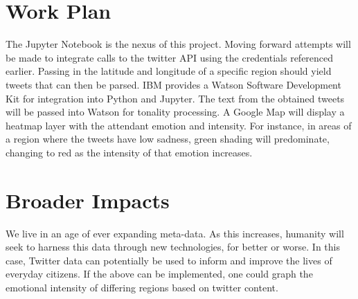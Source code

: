 \documentclass[12pt, oneside]{article}
\begin{document}
\section{Work Plan}
The Jupyter Notebook is the nexus of this project. Moving forward attempts will
be made to integrate calls to the twitter API using the credentials referenced
earlier. Passing in the latitude and longitude of a specific region should
yield tweets that can then be parsed. IBM provides a Watson Software
Development Kit for integration into Python and Jupyter. The text from the
obtained tweets will be passed into Watson for tonality processing. A Google
Map will display a heatmap layer with the attendant emotion and intensity. For
instance, in areas of a region where the tweets have low sadness, green shading
will predominate, changing to red as the intensity of that emotion increases.

\section{Broader Impacts}
We live in an age of ever expanding meta-data. As this increases, humanity will
seek to harness this data through new technologies, for better or worse. In
this case, Twitter data can potentially be used to inform and improve the lives
of everyday citizens. If the above can be implemented, one could graph
the emotional intensity of differing regions based on twitter content.

\newpage{}


%

\end{document}
